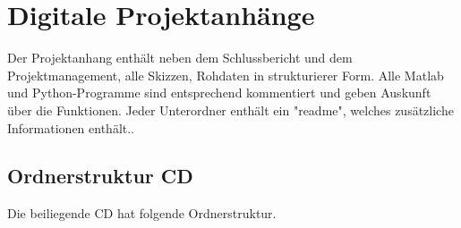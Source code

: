 


\chapter*{Digitale Projektanhänge}
\label{AnhangDig}

Der Projektanhang enthält neben dem Schlussbericht und dem Projektmanagement, alle Skizzen, Rohdaten in strukturierer Form. Alle Matlab und Python-Programme sind entsprechend kommentiert und geben Auskunft über die Funktionen. Jeder Unterordner enthält ein "readme", welches zusätzliche Informationen enthält..
\section{Ordnerstruktur CD}


Die beiliegende CD hat folgende Ordnerstruktur.

